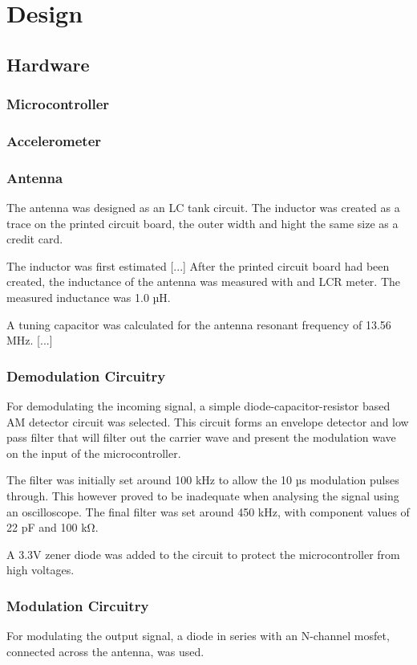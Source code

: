 \section{Design}

\subsection{Hardware}

\subsubsection{Microcontroller}
\subsubsection{Accelerometer}

\subsubsection{Antenna}
The antenna was designed as an LC tank circuit.
The inductor was created as a trace on the printed circuit board, the outer width and hight the same size as a credit card.

The inductor was first estimated [...]
After the printed circuit board had been created, the inductance of the antenna was measured with and LCR meter.
The measured inductance was 1.0 µH.

A tuning capacitor was calculated for the antenna resonant frequency of 13.56 MHz.
[...]

\subsubsection{Demodulation Circuitry}
For demodulating the incoming signal, a simple diode-capacitor-resistor based AM detector circuit was selected.
This circuit forms an envelope detector and low pass filter that will filter out the carrier wave and present the modulation wave on the input of the microcontroller.

The filter was initially set around 100 kHz to allow the 10 µs modulation pulses\cite{rfid-iso} through.
This however proved to be inadequate when analysing the signal using an oscilloscope.
The final filter was set around 450 kHz, with component values of 22 pF and 100 kΩ.

A 3.3V zener diode was added to the circuit to protect the microcontroller from high voltages.

\subsubsection{Modulation Circuitry}
For modulating the output signal, a diode in series with an N-channel mosfet, connected across the antenna, was used.

